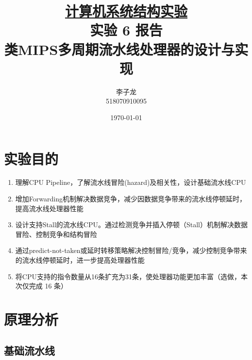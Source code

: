 \documentclass[a4paper,UTF8]{ctexart}
\begin{document}
\title{\normalsize \underline{计算机系统结构实验}\\\LARGE 实验 6 报告\\\vspace*{1em}\normalsize 类MIPS多周期流水线处理器的设计与实现}
\author{李子龙\\ 518070910095}
\date{\today}
\maketitle
\tableofcontents
\clearpage

\section{实验目的}

\begin{enumerate}
    \item 理解CPU Pipeline，了解流水线冒险(hazard)及相关性，设计基础流水线CPU
    \item 增加Forwarding机制解决数据竞争，减少因数据竞争带来的流水线停顿延时，提高流水线处理器性能
    \item 设计支持Stall的流水线CPU。通过检测竞争并插入停顿（Stall）机制解决数据冒险、控制竞争和结构冒险
    \item 通过predict-not-taken或延时转移策略解决控制冒险/竞争，减少控制竞争带来的流水线停顿延时，进一步提高处理器性能
    \item 将CPU支持的指令数量从16条扩充为31条，使处理器功能更加丰富（选做，本次仅完成 16 条）
\end{enumerate}

\section{原理分析}

\subsection{基础流水线}
\end{document}
